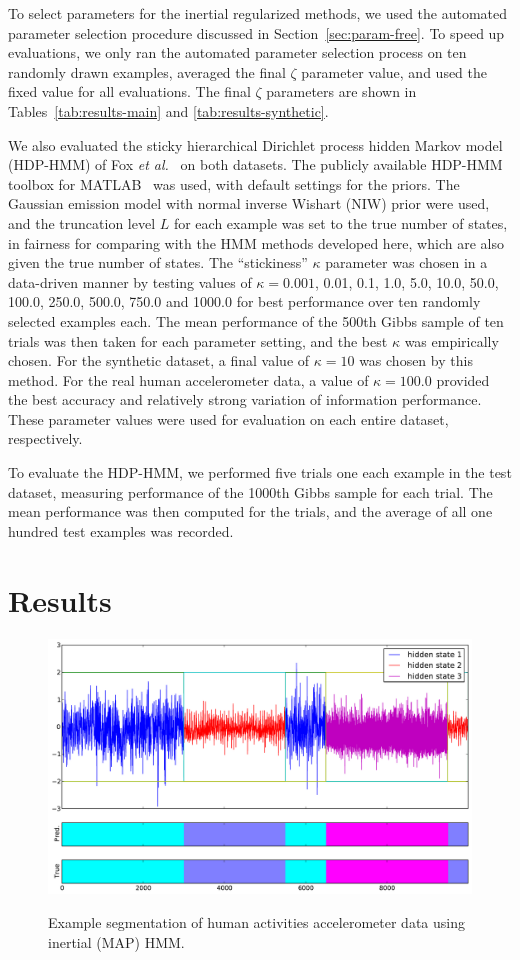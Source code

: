 \documentclass[letterpaper]{article}
\begin{document}
To select parameters for the inertial regularized methods, we used the automated parameter selection procedure discussed in Section~\ref{sec:param-free}. To speed up evaluations, we only ran the automated parameter selection process on ten randomly drawn examples, averaged the final $\zeta$ parameter value, and used the fixed value for all evaluations. The final $\zeta$ parameters are shown in Tables~\ref{tab:results-main} and \ref{tab:results-synthetic}.

We also evaluated the sticky hierarchical Dirichlet process hidden Markov model (HDP-HMM) of Fox \emph{et al.}~\cite{fox2011sticky} on both datasets. The publicly available HDP-HMM toolbox for MATLAB~\cite{HDP-HMM-TOOLKIT} was used, with default settings for the priors. The Gaussian emission model with normal inverse Wishart (NIW) prior were used, and the truncation level $L$ for each example was set to the true number of states, in fairness for comparing with the HMM methods developed here, which are also given the true number of states. The ``stickiness'' $\kappa$ parameter was chosen in a data-driven manner by testing values of $\kappa=0.001$, 0.01, 0.1, 1.0, 5.0, 10.0, 50.0, 100.0, 250.0, 500.0, 750.0 and 1000.0 for best performance over ten randomly selected examples each. The mean performance of the 500th Gibbs sample of ten trials was then taken for each parameter setting, and the best $\kappa$ was empirically chosen. For the synthetic dataset, a final value of $\kappa=10$ was chosen by this method. For the real human accelerometer data, a value of $\kappa=100.0$ provided the best accuracy and relatively strong variation of information performance. These parameter values were used for evaluation on each entire dataset, respectively.

To evaluate the HDP-HMM, we performed five trials one each example in the test dataset, measuring performance of the 1000th Gibbs sample for each trial. The mean performance was then computed for the trials, and the average of all one hundred test examples was recorded.

\section{Results}\label{sec:Results}

\begin{figure}[htbp]
    \caption{Example segmentation of human activities accelerometer data using inertial (MAP) HMM.}
  \centering
    \includegraphics[width=0.8\linewidth]{images/MAP_PARAM_FREE_results_hard_activity_long_1,97_3_states.pdf}
    \label{fig:real-results-MAP}
\end{figure}
\end{document}
